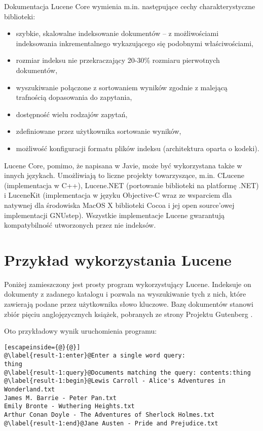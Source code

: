 Dokumentacja Lucene Core wymienia m.in. następujące cechy charakterystyczne biblioteki:
\begin{itemize}
 \item szybkie, skalowalne indeksowanie dokumentów -- z możliwościami indeksowania inkrementalnego wykazującego się podobnymi właściwościami,
 \item rozmiar indeksu nie przekraczający 20-30\% rozmiaru pierwotnych dokumentów,
 \item wyszukiwanie połączone z sortowaniem wyników zgodnie z malejącą trafnością dopasowania do zapytania,
 \item dostępność wielu rodzajów zapytań,
 \item zdefiniowane przez użytkownika sortowanie wyników,
 \item możliwość konfiguracji formatu plików indeksu (architektura oparta o kodeki).
\end{itemize}

Lucene Core, pomimo, że napisana w Javie, może być wykorzystana także w innych językach. Umożliwiają to liczne projekty towarzyszące, m.in. CLucene (implementacja w C++), Lucene.NET (portowanie biblioteki na platformę .NET) i LuceneKit (implementacja w języku Objective-C wraz ze wsparciem dla natywnej dla środowiska MacOS X biblioteki Cocoa i jej open source'owej implementacji GNUstep). Wszystkie implementacje Lucene gwarantują kompatybilność utworzonych przez nie indeksów.

\section{Przykład wykorzystania Lucene}

Poniżej zamieszczony jest prosty program wykorzystujący Lucene. Indeksuje on dokumenty z zadanego katalogu i pozwala na wyszukiwanie tych z nich, które zawierają podane przez użytkownika słowo kluczowe. Bazę dokumentów stanowi zbiór pięciu anglojęzycznych książek, pobranych ze strony Projektu Gutenberg \cite{gutenberg}.

Oto przykładowy wynik uruchomienia programu:
\begin{lstlisting}[escapeinside={@}{@}]
@\label{result-1:enter}@Enter a single word query:
thing
@\label{result-1:query}@Documents matching the query: contents:thing
@\label{result-1:begin}@Lewis Carroll - Alice's Adventures in Wonderland.txt
James M. Barrie - Peter Pan.txt
Emily Bronte - Wuthering Heights.txt
Arthur Conan Doyle - The Adventures of Sherlock Holmes.txt
@\label{result-1:end}@Jane Austen - Pride and Prejudice.txt
\end{lstlisting}

